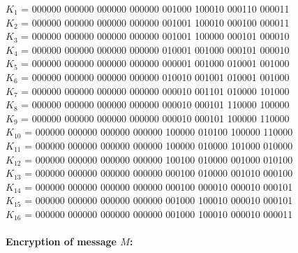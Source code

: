 $K_1$ = 000000 000000 000000 000000 001000 100010 000110 000011\\
$K_2$ = 000000 000000 000000 000000 001001 100010 000100 000011\\
$K_3$ = 000000 000000 000000 000000 001001 100000 000101 000010\\
$K_4$ = 000000 000000 000000 000000 010001 001000 000101 000010\\
$K_5$ = 000000 000000 000000 000000 000001 001000 010001 001000\\
$K_6$ = 000000 000000 000000 000000 010010 001001 010001 001000\\
$K_7$ =  000000 000000 000000 000000 000010 001101 010000 101000\\
$K_8$ =  000000 000000 000000 000000 000010 000101 110000 100000\\
$K_9$ =  000000 000000 000000 000000 000010 000101 100000 110000\\
$K_{10}$ =  000000 000000 000000 000000 100000 010100 100000 110000\\
$K_{11}$ =  000000 000000 000000 000000 100000 010000 101000 010000\\
$K_{12}$ =  000000 000000 000000 000000 100100 010000 001000 010100 \\
$K_{13}$ =  000000 000000 000000 000000 000100 010000 001010 000100\\
$K_{14}$ =  000000 000000 000000 000000 000100 000010 000010 000101\\
$K_{15}$ =  000000 000000 000000 000000 001000 100010 000010 000101\\
$K_{16}$ =  000000 000000 000000 000000 001000 100010 000010 000011\\
\bigskip

\paragraph{Encryption of message $M$:}
\bigskip

